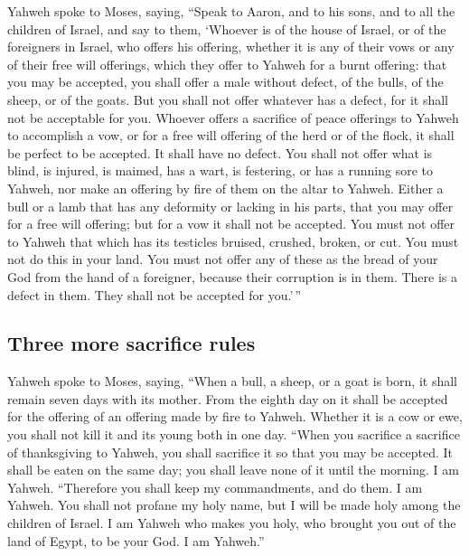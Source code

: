  Yahweh spoke to Moses, saying,  ``Speak
to Aaron, and to his sons, and to all the children of Israel, and say to
them, `Whoever is of the house of Israel, or of the foreigners in
Israel, who offers his offering, whether it is any of their vows or any
of their free will offerings, which they offer to Yahweh for a burnt
offering:  that you may be accepted, you shall offer a
male without defect, of the bulls, of the sheep, or of the goats.
 But you shall not offer whatever has a defect, for it
shall not be acceptable for you.  Whoever offers a
sacrifice of peace offerings to Yahweh to accomplish a vow, or for a
free will offering of the herd or of the flock, it shall be perfect to
be accepted. It shall have no defect.  You shall not
offer what is blind, is injured, is maimed, has a wart, is festering, or
has a running sore to Yahweh, nor make an offering by fire of them on
the altar to Yahweh.  Either a bull or a lamb that has
any deformity or lacking in his parts, that you may offer for a free
will offering; but for a vow it shall not be accepted. 
You must not offer to Yahweh that which has its testicles bruised,
crushed, broken, or cut. You must not do this in your land.
 You must not offer any of these as the bread of your God
from the hand of a foreigner, because their corruption is in them. There
is a defect in them. They shall not be accepted for you.'\,''

\hypertarget{three-more-sacrifice-rules}{%
\subsection{Three more sacrifice
rules}\label{three-more-sacrifice-rules}}

 Yahweh spoke to Moses, saying,  ``When a
bull, a sheep, or a goat is born, it shall remain seven days with its
mother. From the eighth day on it shall be accepted for the offering of
an offering made by fire to Yahweh.  Whether it is a cow
or ewe, you shall not kill it and its young both in one day.
 ``When you sacrifice a sacrifice of thanksgiving to
Yahweh, you shall sacrifice it so that you may be accepted.
 It shall be eaten on the same day; you shall leave none
of it until the morning. I am Yahweh.  ``Therefore you
shall keep my commandments, and do them. I am Yahweh. 
You shall not profane my holy name, but I will be made holy among the
children of Israel. I am Yahweh who makes you holy,  who
brought you out of the land of Egypt, to be your God. I am Yahweh.''

